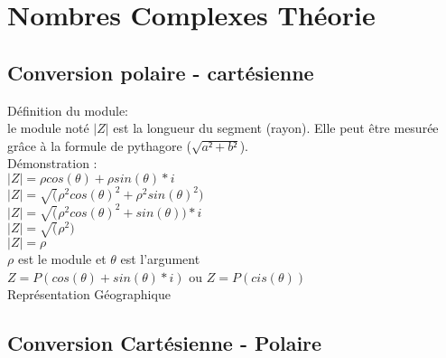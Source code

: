 \newpage

\section{Nombres Complexes Théorie}
\vspace{5mm} %

\subsection{Conversion polaire - cartésienne}
\vspace{5mm} %

Définition du module: \\

le module noté $|Z|$ est la longueur du segment (rayon). Elle peut être mesurée  grâce à la formule de pythagore ($\sqrt{a²+b²}$). \\

Démonstration : \\

$|Z| = \rho cos(\theta)+ \rho sin(\theta) *i$ \\
$|Z| = \sqrt(\rho^{2} cos(\theta)^{2}+ \rho^{2} sin(\theta)^{2})$ \\
$|Z| = \sqrt(\rho^{2} cos(\theta)^{2}+ sin(\theta))*i $ \\
$|Z| = \sqrt(\rho^{2}) $ \\
$|Z| = \rho $ \\

$\rho$ est le module et $\theta$ est l'argument \\
$Z= P(cos(\theta) + sin(\theta)*i )$ ou $Z= P(cis(\theta))$\\

\vspace{5mm} %
Représentation Géographique \\


\newpage

\subsection{Conversion Cartésienne - Polaire}
\vspace{5mm} %

